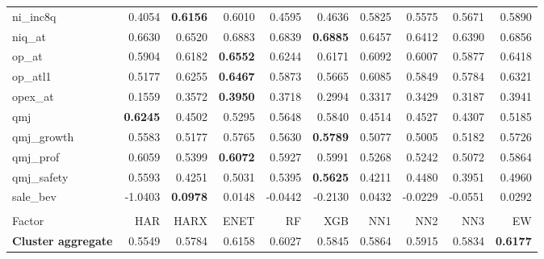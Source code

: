 \begin{longtable}{>{\raggedright\arraybackslash}p{2.6cm}rrrrrrrrr}
ni\_inc8q & 0.4054 & \textbf{\cellcolor{blue!10}0.6156} & \cellcolor{blue!10}0.6010 & \cellcolor{blue!10}0.4595 & \cellcolor{blue!10}0.4636 & \cellcolor{blue!10}0.5825 & \cellcolor{blue!10}0.5575 & \cellcolor{blue!10}0.5671 & \cellcolor{blue!10}0.5890 \\
niq\_at & 0.6630 & 0.6520 & \cellcolor{blue!10}0.6883 & \cellcolor{blue!10}0.6839 & \textbf{\cellcolor{blue!10}0.6885} & 0.6457 & 0.6412 & 0.6390 & \cellcolor{blue!10}0.6856 \\
op\_at & 0.5904 & \cellcolor{blue!10}0.6182 & \textbf{\cellcolor{blue!10}0.6552} & \cellcolor{blue!10}0.6244 & \cellcolor{blue!10}0.6171 & \cellcolor{blue!10}0.6092 & \cellcolor{blue!10}0.6007 & 0.5877 & \cellcolor{blue!10}0.6418 \\
op\_atl1 & 0.5177 & \cellcolor{blue!10}0.6255 & \textbf{\cellcolor{blue!10}0.6467} & \cellcolor{blue!10}0.5873 & \cellcolor{blue!10}0.5665 & \cellcolor{blue!10}0.6085 & \cellcolor{blue!10}0.5849 & \cellcolor{blue!10}0.5784 & \cellcolor{blue!10}0.6321 \\
opex\_at & 0.1559 & \cellcolor{blue!10}0.3572 & \textbf{\cellcolor{blue!10}0.3950} & \cellcolor{blue!10}0.3718 & \cellcolor{blue!10}0.2994 & \cellcolor{blue!10}0.3317 & \cellcolor{blue!10}0.3429 & \cellcolor{blue!10}0.3187 & \cellcolor{blue!10}0.3941 \\
qmj & \textbf{0.6245} & 0.4502 & 0.5295 & 0.5648 & 0.5840 & 0.4514 & 0.4527 & 0.4307 & 0.5185 \\
qmj\_growth & 0.5583 & 0.5177 & \cellcolor{blue!10}0.5765 & \cellcolor{blue!10}0.5630 & \textbf{\cellcolor{blue!10}0.5789} & 0.5077 & 0.5005 & 0.5182 & \cellcolor{blue!10}0.5726 \\
qmj\_prof & 0.6059 & 0.5399 & \textbf{\cellcolor{blue!10}0.6072} & 0.5927 & 0.5991 & 0.5268 & 0.5242 & 0.5072 & 0.5864 \\
qmj\_safety & 0.5593 & 0.4251 & 0.5031 & 0.5395 & \textbf{\cellcolor{blue!10}0.5625} & 0.4211 & 0.4480 & 0.3951 & 0.4960 \\
sale\_bev & -1.0403 & \textbf{\cellcolor{blue!10}0.0978} & \cellcolor{blue!10}0.0148 & \cellcolor{blue!10}-0.0442 & \cellcolor{blue!10}-0.2130 & \cellcolor{blue!10}0.0432 & \cellcolor{blue!10}-0.0229 & \cellcolor{blue!10}-0.0551 & \cellcolor{blue!10}0.0292 \\
\hline
\multicolumn{10}{@{}l}{\textit{Panel J. Seasonality}} \\
\hline
Factor & HAR & HARX & ENET & RF & XGB & NN1 & NN2 & NN3 & EW \\
\hline
\textbf{Cluster aggregate} & 0.5549 & \cellcolor{blue!10}0.5784 & \cellcolor{blue!10}0.6158 & \cellcolor{blue!10}0.6027 & \cellcolor{blue!10}0.5845 & \cellcolor{blue!10}0.5864 & \cellcolor{blue!10}0.5915 & \cellcolor{blue!10}0.5834 & \textbf{\cellcolor{blue!10}0.6177} \\

\end{longtable}
